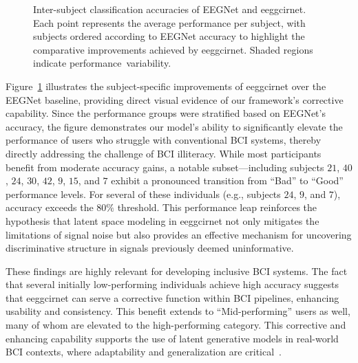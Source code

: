 \begin{figure}[H]
{}
  \caption{Inter-subject classification accuracies of EEGNet and \gls{eeggcirnet}. Each point represents the average performance per subject, with subjects ordered according to EEGNet accuracy to highlight the comparative improvements achieved by \gls{eeggcirnet}. Shaded regions indicate \mbox{performance variability}.}
  \label{fig:gains}
\end{figure}
Figure~\ref{fig:gains} illustrates the subject-specific improvements of \gls{eeggcirnet} over the EEGNet baseline, providing direct visual evidence of our framework's corrective capability. Since the performance groups were stratified based on EEGNet's accuracy, the figure demonstrates our model's ability to significantly elevate the performance of users who struggle with conventional BCI systems, thereby directly addressing the challenge of BCI illiteracy. While most participants benefit from moderate accuracy gains, a notable subset—including subjects $21$, $40$, $24$, $30$, $42$, $9$, $15$, and $7$ exhibit a pronounced transition from ``Bad'' to ``Good'' performance levels. For several of these individuals (e.g., subjects $24$, $9$, and $7$), accuracy exceeds the $80\%$ threshold. This performance leap reinforces the hypothesis that latent space modeling in \gls{eeggcirnet} not only mitigates the limitations of signal noise but also provides an effective mechanism for uncovering discriminative structure in signals previously deemed uninformative.

These findings are highly relevant for developing inclusive BCI systems. The fact that several initially low-performing individuals achieve high accuracy suggests that \gls{eeggcirnet} can serve a corrective function within BCI pipelines, enhancing usability and consistency. This benefit extends to ``Mid-performing'' users as well, many of whom are elevated to the high-performing category. This corrective and enhancing capability supports the use of latent generative models in real-world BCI contexts, where adaptability and generalization are critical~\cite{nagarajan2024deeptransfer, gomez2021kernelcca, demir2021autobayes}.

